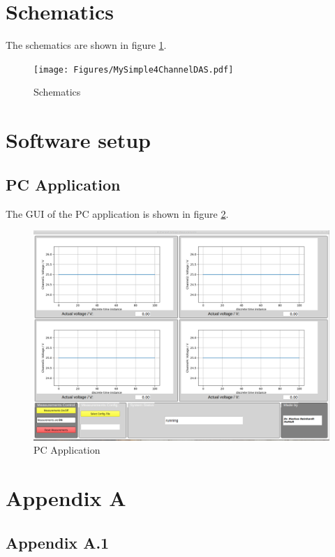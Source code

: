 \documentclass[11pt, oneside]{scrartcl}   	%
\begin{document}
\newpage
\section{Schematics}
The schematics are shown in figure \ref{fig:Schematics}.
\begin{figure}[htbp]
	\centering
	\label{fig:Schematics}
	\texttt{[image: Figures/MySimple4ChannelDAS.pdf]}
	\caption[Schematics]{Schematics}
\end{figure}

\newpage
\section{Software setup}
\subsection{PC Application}
The GUI of the PC application is shown in figure \ref{fig:ApplicationWindow}.
\begin{figure}[htbp]
	\centering
	\label{fig:ApplicationWindow}
	\includegraphics[width=1.0\linewidth]{Figures/ApplicationWindow.png}
	\caption[PC Application]{PC Application}
\end{figure}
\newpage

\appendix
\section{Appendix A}
\subsection{Appendix A.1}	
\end{document}
